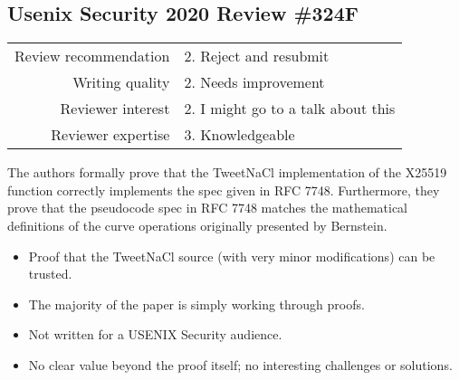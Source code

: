 \newpage
\subsection{Usenix Security 2020 Review \#324F}

\begin{tabular}{rl}
    \toprule
    Review recommendation & 2. Reject and resubmit             \\
    Writing quality       & 2. Needs improvement               \\
    Reviewer interest     & 2. I might go to a talk about this \\
    Reviewer expertise    & 3. Knowledgeable                   \\
    \bottomrule
\end{tabular}

\begin{center}
\end{center}

The authors formally prove that the TweetNaCl implementation of the X25519
function correctly implements the spec given in RFC 7748. Furthermore, they
prove that the pseudocode spec in RFC 7748 matches the mathematical definitions
of the curve operations originally presented by Bernstein.

\begin{center}
\end{center}
\begin{itemize}
    \item Proof that the TweetNaCl source (with very minor modifications) can be trusted.
\end{itemize}

\begin{center}
\end{center}

\begin{itemize}
    \item The majority of the paper is simply working through proofs.
    \item Not written for a USENIX Security audience.
    \item No clear value beyond the proof itself; no interesting challenges or solutions.
\end{itemize}

\begin{center}
\end{center}

